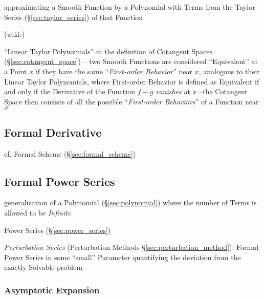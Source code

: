 approximating a Smooth Function by a Polynomial with Terms from the
Taylor Series (\S\ref{sec:taylor_series}) of that Function

(wiki:)

``Linear Taylor Polynomials'' in the definition of Cotangent Spaces
(\S\ref{sec:cotangent_space}) -- two Smooth Functions are considered
``Equivalent'' at a Point $x$ if they have the same ``\emph{First-order
  Behavior}'' near $x$, analogous to their Linear Taylor Polynomials,
where First-order Behavior is defined as Equivalent if and only if the
Derivative of the Function $f-g$ \emph{vanishes} at $x$ --the Cotangent Space
then consists of all the possible ``\emph{First-order Behaviors}'' of a
Function near $x$



\subsection{Formal Derivative}\label{sec:formal_derivative}


cf. Formal Scheme (\S\ref{sec:formal_scheme})



\subsection{Formal Power Series}\label{sec:formal_power_series}

generalization of a Polynomial (\S\ref{sec:polynomial}) where the number of
Terms is allowed to be \emph{Infinite}

\fist Power Series (\S\ref{sec:power_series})

\fist \emph{Perturbation Series} (Perturbation Methods
\S\ref{sec:perturbation_method}): Formal Power Series in some ``small''
Parameter quantifying the deviation from the exactly Solvable problem



\subsubsection{Asymptotic Expansion}\label{sec:asymptotic_expansion}

